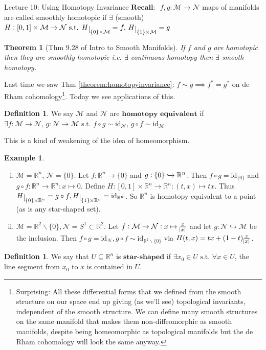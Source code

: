 \documentclass[10pt]{article}
\theoremstyle{plain}
\newtheorem{theorem}{Theorem}[section]
\theoremstyle{definition}
\newtheorem{defn}[thm]{Definition} %
\newtheorem{exmp}[thm]{Example} %
\newcommand{\st}{\text{ s.t. }}
\newcommand{\Recall}{\textbf{Recall: }}
\newcommand{\id}{\text{id}}
\newcommand{\Real}{\mathbb{R}}
\newcommand{\man}{\mathcal{M}}
\newcommand{\nan}{\mathcal{N}}
\def\restrict#1{\raise-.5ex\hbox{\ensuremath|}_{#1}}
\newcommand{\inter}{\left[0,1\right]}
\begin{document}
\begin{section}{Lecture 10: Using Homotopy Invariance}
$\Recall$ $f,g:\man\to\nan$ maps of manifolds are called smoothly homotopic if $\exists $ (smooth) $H:\inter \times \man \to \nan \st H\restrict{\{0\}\times \man} = f , \, H\restrict{\{1\}\times \man} = g$
\begin{theorem}[Thm 9.28 of Intro to Smooth Manifolds]
If $f$ and $g$ are homotopic then they are smoothly homotopic i.e. $\exists $ continuous homotopy then $\exists $ smooth homotopy.
\end{theorem}\noindent
Last time we saw Thm \ref{theorem:homotopyinvariance}: $f\sim g \implies f^* = g^*$ on de Rham cohomology\footnote{Surprising: All these differential forms that we defined from the smooth structure on our space end up giving (as we'll see) topological invariants, independent of the smooth structure. We can define many smooth structures on the same manifold that makes them non-diffeomorphic as smooth manifolds, despite being homeomorphic as topological manifolds but the de Rham cohomology will look the same anyway.}. Today we see applications of this.
\begin{defn}
We say $\man$ and $\nan$ are $\textbf{homotopy equivalent}$ if $\exists f:\man \to \nan, \, g: \nan\to\man \st f\circ g \sim \id_\nan , \, g\circ f \sim \id_\man$.
\end{defn}
This is a kind of weakening of the idea of homeomorphism.
\begin{exmp}
\begin{enumerate}[(i)]
    \item $\man = \Real ^n, \, \nan = \{0\}.$ Let $f:\Real^n \to \{0\}$ and $g:\{0\} \xhookrightarrow{} \Real^n$. Then $f\circ g = \id_{\{0\}}$ and $g\circ f : \Real^n \to \Real^n : x \mapsto 0$. Define $H: \inter \times \Real^n \to \Real ^n : (t,x) \mapsto tx$. Thus $H\restrict{\{0\}\times \Real^n} = g\circ f , H\restrict{\{1\}\times \Real^n} = \id_{\Real^n}$. So $\Real^n$ is homotopy equivalent to a point (as is any star-shaped set).
    \item $\man = \Real^2\backslash \{0\}, \nan = S^1 \subset \Real^2$. Let $f: \man \to \nan: x\mapsto \frac{x}{\abs{x}}$ and let $g: \nan \hookrightarrow \man$ be the inclusion. Then $f\circ g = \id_{\nan}, g\circ f \sim \id_{\Real^2\backslash\{0\}}$ via $H(t,x) = tx + (1-t) \frac{x}{\abs{x}}$.
\end{enumerate}
\end{exmp}
\begin{defn}
We say that $U\subseteq \Real^n$ is $\textbf{star-shaped}$ if $\exists x_0 \in U \st \forall x\in U $, the line segment from $x_0$ to $x$ is contained in $U$.

\end{defn}
\end{section}
\end{document}
